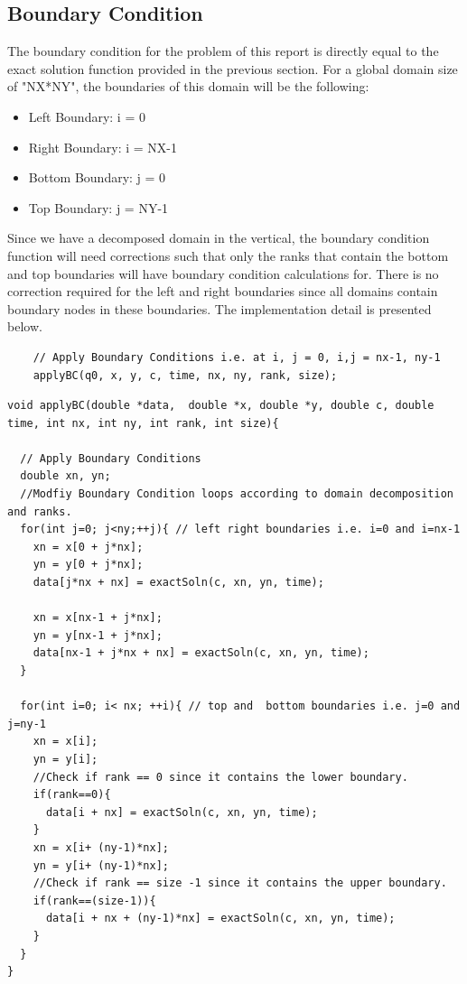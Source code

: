 \documentclass[12pt]{article}
\begin{document}
\subsection{Boundary Condition}
The boundary condition for the problem of this report is directly equal to the exact solution function provided in the previous section. For a global domain size of "NX*NY", the boundaries of this domain will be the following:
\begin{itemize}
    \item Left Boundary: i = 0
    \item Right Boundary: i = NX-1
    \item Bottom Boundary: j = 0
    \item Top Boundary: j = NY-1
\end{itemize}
Since we have a decomposed domain in the vertical, the boundary condition function will need corrections such that only the ranks that contain the bottom and top boundaries will have boundary condition calculations for. There is no correction required for the left and right boundaries since all domains contain boundary nodes in these boundaries. The implementation detail is presented below.
        \begin{verbatim}
    // Apply Boundary Conditions i.e. at i, j = 0, i,j = nx-1, ny-1
    applyBC(q0, x, y, c, time, nx, ny, rank, size); 
    \end{verbatim}
        \begin{verbatim}
void applyBC(double *data,  double *x, double *y, double c, double time, int nx, int ny, int rank, int size){

  // Apply Boundary Conditions
  double xn, yn; 
  //Modfiy Boundary Condition loops according to domain decomposition and ranks.
  for(int j=0; j<ny;++j){ // left right boundaries i.e. i=0 and i=nx-1
    xn = x[0 + j*nx]; 
    yn = y[0 + j*nx];    
    data[j*nx + nx] = exactSoln(c, xn, yn, time); 

    xn = x[nx-1 + j*nx]; 
    yn = y[nx-1 + j*nx];    
    data[nx-1 + j*nx + nx] = exactSoln(c, xn, yn, time); 
  }

  for(int i=0; i< nx; ++i){ // top and  bottom boundaries i.e. j=0 and j=ny-1
    xn = x[i]; 
    yn = y[i];
    //Check if rank == 0 since it contains the lower boundary.
    if(rank==0){
      data[i + nx] = exactSoln(c, xn, yn, time);
    }
    xn = x[i+ (ny-1)*nx]; 
    yn = y[i+ (ny-1)*nx];
    //Check if rank == size -1 since it contains the upper boundary.
    if(rank==(size-1)){     
      data[i + nx + (ny-1)*nx] = exactSoln(c, xn, yn, time);
    }
  }
}
\end{verbatim}
\end{document}
